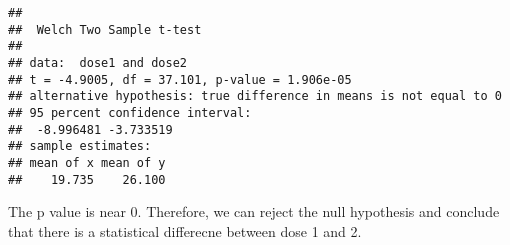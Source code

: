 \documentclass[
]{article}
\newenvironment{Shaded}{\begin{snugshade}}{\end{snugshade}}
\newcommand{\DecValTok}[1]{\textcolor[rgb]{0.00,0.00,0.81}{#1}}
\newcommand{\KeywordTok}[1]{\textcolor[rgb]{0.13,0.29,0.53}{\textbf{#1}}}
\newcommand{\NormalTok}[1]{#1}
\newcommand{\OperatorTok}[1]{\textcolor[rgb]{0.81,0.36,0.00}{\textbf{#1}}}
\newcommand{\StringTok}[1]{\textcolor[rgb]{0.31,0.60,0.02}{#1}}
\begin{document}
\begin{Shaded}
\end{Shaded}

\begin{verbatim}
## 
##  Welch Two Sample t-test
## 
## data:  dose1 and dose2
## t = -4.9005, df = 37.101, p-value = 1.906e-05
## alternative hypothesis: true difference in means is not equal to 0
## 95 percent confidence interval:
##  -8.996481 -3.733519
## sample estimates:
## mean of x mean of y 
##    19.735    26.100
\end{verbatim}

The p value is near 0. Therefore, we can reject the null hypothesis and
conclude that there is a statistical differecne between dose 1 and 2.
\end{document}
